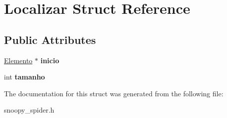 \hypertarget{struct_localizar}{}\section{Localizar Struct Reference}
\label{struct_localizar}
\subsection*{Public Attributes}
\begin{DoxyCompactItemize}
\item 
\mbox{\label{struct_localizar_a35f7ec9b00852e3e0e7aa10f9cc94ac2}} 
\mbox{\hyperlink{struct_elemento__da__lista}{Elemento}} $\ast$ {\bfseries inicio}
\item 
\mbox{\label{struct_localizar_a5303a15e90382bc8dcd2d59537d74d54}} 
int {\bfseries tamanho}
\end{DoxyCompactItemize}


The documentation for this struct was generated from the following file\+:\begin{DoxyCompactItemize}
\item 
snoopy\+\_\+spider.\+h\end{DoxyCompactItemize}
